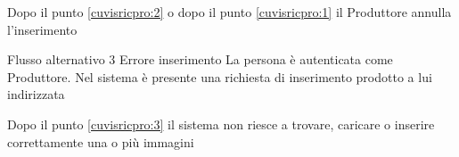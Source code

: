 {\begin{enumCU}
		\item Dopo il punto \ref{cuvisricpro:2} o dopo il punto \ref{cuvisricpro:1} il Produttore annulla l'inserimento
	\end{enumCU}}%
%
{Flusso alternativo 3}%
{Errore inserimento}%
{La persona è autenticata come Produttore. Nel sistema è presente una richiesta di inserimento prodotto a lui indirizzata}
{\postNulle}%
{\begin{enumCU}
		\item Dopo il punto \ref{cuvisricpro:3} il sistema non riesce a trovare, caricare o inserire correttamente una o più immagini
	\end{enumCU}}%

\tabcuvspace

